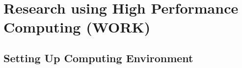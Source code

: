 \chapter{\label{Appendix_HPC}
Research using High Performance Computing (WORK)}

\section{\label{A:Comp_Env}Setting Up Computing Environment}









